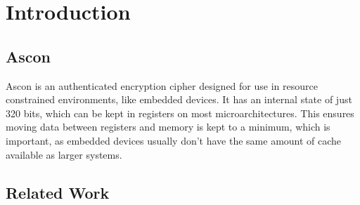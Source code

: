 \section{Introduction}

\subsection{Ascon}

Ascon\cite{ascon} is an authenticated encryption cipher designed for use in
resource constrained environments, like embedded devices. It has an internal
state of just 320 bits, which can be kept in registers on most
microarchitectures. This ensures moving data between registers and memory is
kept to a minimum, which is important, as embedded devices usually don't have
the same amount of cache available as larger systems.

\subsection{Related Work}

\cite{neon}
\cite{sat}
